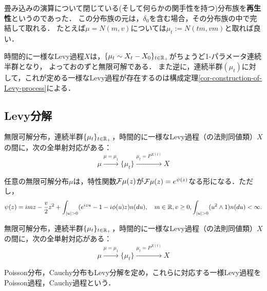 \documentclass[uplatex,dvipdfmx]{jsreport}
\begin{document}
\begin{example}
    畳み込みの演算について閉じている(そして何らかの関手性を持つ)分布族を\textbf{再生性}というのであった．
    この分布族の元は，$\delta_0$を含む場合，その分布族の中で完結して取れる．
    たとえば$\mu=N(m,v)$については$\mu_t:=N(tm,vm)$と取れば良い．
\end{example}

\begin{example}[時間的に一様なLevy過程]
    時間的に一様なLevy過程$X$は，$\{\mu_t\sim X_t-X_0\}_{t\in\mathbb{R}_+}$がちょうど1-パラメータ連続半群となり，
    よっておのずと無限可解である．
    また逆に，連続半群$(\mu_t)$に対して，これが定める一様なLevy過程が存在するのは構成定理\ref{cor-construction-of-Levy-process}による．
\end{example}

\subsection{Levy分解}

\begin{tcolorbox}[colframe=ForestGreen, colback=ForestGreen!10!white,breakable,colbacktitle=ForestGreen!40!white,coltitle=black,fonttitle=\bfseries\sffamily,
title=]
    無限可解分布，連続半群$\{\mu_t\}_{t\in\mathbb{R}_+}$，時間的に一様なLevy過程（の法則同値類）$X$の間に，次の全単射対応がある：
    \[\mu\xrightarrow{\mu=\mu_1}\{\mu_t\}\xrightarrow{\mu_t=P^{X(t)}}X\]
\end{tcolorbox}

\begin{theorem}[無限可解分布のLevy分解定理]
    任意の無限可解分布$\mu$は，特性関数$\mathcal{F}\mu(z)$が$\mathcal{F}\mu(z)=e^{\psi(z)}$なる形になる．ただし，
    \[\psi(z)=imz-\frac{v}{2}z^2+\int_{\lvert u\rvert>0}(e^{izu}-1-i\phi(u)z)n(du),\quad m\in\mathbb{R},v\ge0,\int_{\lvert u\rvert>0}(u^2\land 1)n(du)<\infty.\]
\end{theorem}

\begin{corollary}
    無限可解分布，連続半群$\{\mu_t\}_{t\in\mathbb{R}_+}$，時間的に一様なLevy過程（の法則同値類）$X$の間に，次の全単射対応がある：
    \[\mu\xrightarrow{\mu=\mu_1}\{\mu_t\}\xrightarrow{\mu_t=P^{X(t)}}X\]
\end{corollary}

\begin{example}
    Poisson分布，Cauchy分布もLevy分解を定め，これらに対応する一様Levy過程をPoisson過程，Cauchy過程という．
\end{example}
\end{document}
